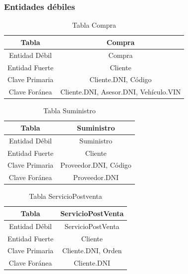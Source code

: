 \documentclass[12pt]{article}
\begin{document}
\subsubsection{Entidades d\'ebiles}

\begin{table}[htbp]
\begin{center}
\begin{tabular}{|c|c|}
\hline
Tabla & Compra \\
\hline
Entidad Débil & Compra \\
\hline
Entidad Fuerte & Cliente \\
\hline
Clave Primaria & Cliente.DNI, Código \\
\hline
Clave Foránea & Cliente.DNI, Asesor.DNI, Vehículo.VIN \\
\hline
\end{tabular}
\caption{Tabla Compra}
\label{tab:tablas}
\end{center}
\end{table}


\begin{table}[htbp]
\begin{center}
\begin{tabular}{|c|c|}
\hline
Tabla & Suministro \\
\hline
Entidad Débil & Suministro \\
\hline
Entidad Fuerte & Cliente \\
\hline
Clave Primaria & Proveedor.DNI, Código \\
\hline
Clave Foránea & Proveedor.DNI \\
\hline
\end{tabular}
\caption{Tabla Suministro}
\label{tab:tablas}
\end{center}
\end{table}


\begin{table}[htbp]
\begin{center}
\begin{tabular}{|c|c|}
\hline
Tabla & ServicioPostVenta \\
\hline
Entidad Débil & ServicioPostVenta \\
\hline
Entidad Fuerte & Cliente \\
\hline
Clave Primaria & Cliente.DNI, Orden \\
\hline
Clave Foránea & Cliente.DNI \\
\hline
\end{tabular}
\caption{Tabla ServicioPostventa}
\label{tab:tablas}
\end{center}
\end{table}
\end{document}
